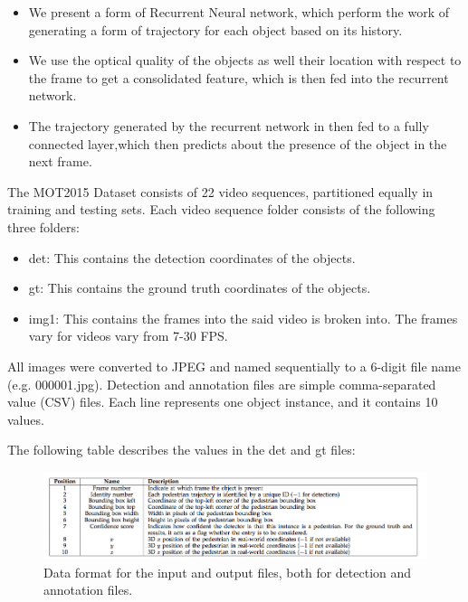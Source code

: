 \documentclass[journal]{IEEEtran}
\begin{document}
\begin{itemize}
    \item We present a form of Recurrent Neural network, which perform the work of generating a form of trajectory for each object based on its history.
    \item We use the optical quality of the objects as well their location with respect to the frame to get a consolidated feature, which is then fed into the recurrent network.
    \item The trajectory generated by the recurrent network in then fed to a fully connected layer,which then predicts about the presence of the object in the next frame.
    
\end{itemize}
The MOT2015 Dataset consists of 22 video sequences, partitioned equally in training and testing sets. Each video sequence folder consists of the following three folders:
    \begin{itemize}
        \item det: This contains the detection coordinates of the objects.
        \item gt: This contains the ground truth coordinates of the objects.
        \item img1: This contains the frames into the said video is broken into. The frames vary for videos vary from 7-30 FPS.
    \end{itemize}
All images were converted to JPEG and named sequentially to a 6-digit file name (e.g. 000001.jpg). Detection and annotation files are simple comma-separated value (CSV) files. Each line represents one object instance, and it contains 10 values. 
\par
The following table describes the values in the det and gt files:
\begin{figure}[ht!]
    \centering
    \includegraphics[scale = 0.3]{Dataset.png}
    \caption{Data format for the input and output files, both for detection and annotation files.}
    \label{fig:data}
\end{figure}
\end{document}
